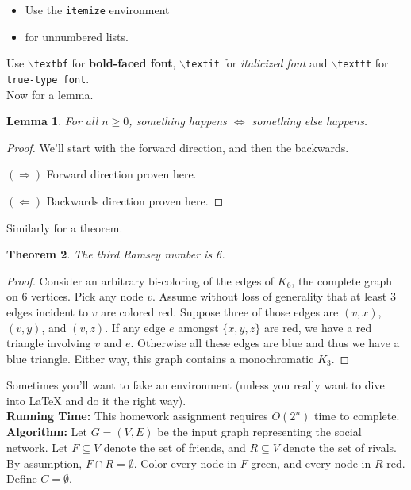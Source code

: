 \documentclass[11pt]{article}
\newtheorem{lemma}{Lemma}
\newtheorem{theorem}[lemma]{Theorem}
\begin{document}
\begin{itemize}
\item Use the {\tt itemize} environment
\item for unnumbered lists.
\end{itemize}
 
 
 Use {\tt$\backslash$textbf} for \textbf{bold-faced font}, {\tt$\backslash$textit} for \textit{italicized font} and {\tt$\backslash$texttt} for \texttt{true-type font}.\\


Now for a lemma.

\begin{lemma}
For all $n \geq 0$, something happens $\iff$ something else happens.
\end{lemma}

\begin{proof}We'll start with the forward direction, and then the backwards.\medskip

\noindent $(\Rightarrow)$ Forward direction proven here.\medskip

\noindent $(\Leftarrow)$ Backwards direction proven here.\end{proof}

Similarly for a theorem.

\begin{theorem}
The third Ramsey number is 6.
\end{theorem}

\begin{proof}
Consider an arbitrary bi-coloring of the edges of $K_6$, the complete graph on 6 vertices.   Pick any node $v$.  Assume without loss of generality that at least 3 edges incident to $v$ are colored red.  Suppose three of those edges are $(v,x)$, $(v,y)$, and $(v,z)$.  If any edge $e$ amongst $\{x,y,z\}$ are red, we have a red triangle involving $v$ and $e$.  Otherwise all these edges are blue and thus we have a blue triangle.  Either way, this graph contains a monochromatic $K_3$. 
\end{proof}

Sometimes you'll want to fake an environment (unless you really want to dive into LaTeX and do it the right way).\\

\noindent \textbf{Running Time:} This homework assignment requires $O(2^n)$ time to complete.\\

\noindent \textbf{Algorithm:} Let $G = (V,E)$ be the input graph representing the social network. Let $F \subseteq V$ denote the set of friends, and $R \subseteq V$ denote the set of rivals.  By assumption, $F \cap R = \emptyset$.  Color every node in $F$ green, and every node in $R$ red.  Define $C = \emptyset$.
\end{document}
